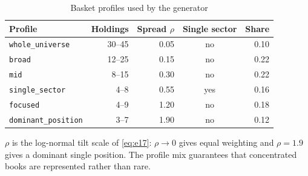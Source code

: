 \begin{table}[t]
\caption{Basket profiles used by the generator}
\label{tab:t3}
\centering
\footnotesize
\begin{tabular}{@{}lrrcr@{}}
\toprule
Profile & Holdings & Spread $\rho$ & Single sector & Share \\
\midrule
\texttt{whole\_universe} & 30--45 & 0.05 & no & 0.10 \\
\texttt{broad} & 12--25 & 0.15 & no & 0.22 \\
\texttt{mid} & 8--15 & 0.30 & no & 0.22 \\
\texttt{single\_sector} & 4--8 & 0.55 & yes & 0.16 \\
\texttt{focused} & 4--9 & 1.20 & no & 0.18 \\
\texttt{dominant\_position} & 3--7 & 1.90 & no & 0.12 \\
\bottomrule
\end{tabular}

\vspace{0.5mm}
\raggedright\footnotesize
$\rho$ is the log-normal tilt scale of \eqref{eq:e17}: $\rho\to 0$ gives equal
weighting and $\rho=1.9$ gives a dominant single position. The profile mix
guarantees that concentrated books are represented rather than rare.
\end{table}
